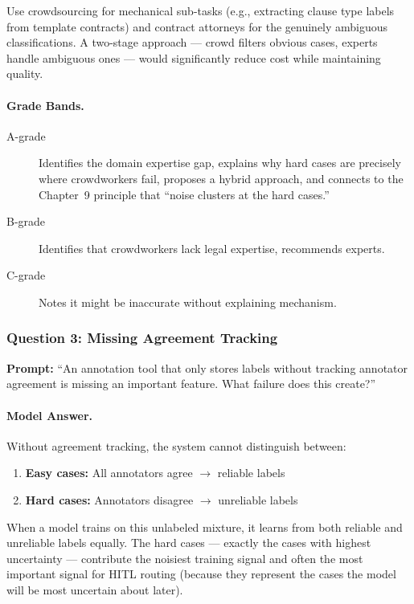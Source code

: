Use crowdsourcing for mechanical sub-tasks (e.g., extracting clause type labels from template contracts) and contract attorneys for the genuinely ambiguous classifications. A two-stage approach --- crowd filters obvious cases, experts handle ambiguous ones --- would significantly reduce cost while maintaining quality.

\paragraph{Grade Bands.}

\begin{description}
    \item[A-grade] Identifies the domain expertise gap, explains why hard cases are precisely where crowdworkers fail, proposes a hybrid approach, and connects to the Chapter~9 principle that ``noise clusters at the hard cases.''
    \item[B-grade] Identifies that crowdworkers lack legal expertise, recommends experts.
    \item[C-grade] Notes it might be inaccurate without explaining mechanism.
\end{description}

\subsubsection{Question 3: Missing Agreement Tracking}

\textbf{Prompt:} ``An annotation tool that only stores labels without tracking annotator agreement is missing an important feature. What failure does this create?''

\paragraph{Model Answer.}

Without agreement tracking, the system cannot distinguish between:

\begin{enumerate}
    \item \textbf{Easy cases:} All annotators agree $\rightarrow$ reliable labels
    \item \textbf{Hard cases:} Annotators disagree $\rightarrow$ unreliable labels
\end{enumerate}

When a model trains on this unlabeled mixture, it learns from both reliable and unreliable labels equally. The hard cases --- exactly the cases with highest uncertainty --- contribute the noisiest training signal and often the most important signal for HITL routing (because they represent the cases the model will be most uncertain about later).


